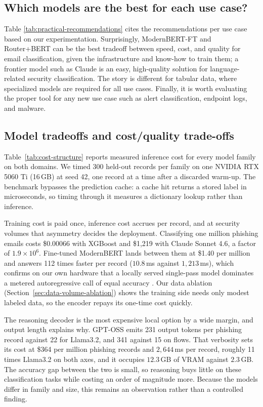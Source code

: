 \documentclass{jmlr}
\begin{document}
\subsection{Which models are the best for each use case?}
\label{sec:which-models-best}

Table \ref{tab:practical-recommendations} cites the recommendations per use case based on our experimentation. Surprisingly, ModernBERT-FT and Router+BERT can be the best tradeoff between speed, cost, and quality for email classification, given the infrastructure and know-how to train them; a frontier model such as Claude is an easy, high-quality solution for language-related security classification. The story is different for tabular data, where specialized models are required for all use cases. Finally, it is worth evaluating the proper tool for any new use case such as alert classification, endpoint logs, and malware.

\subsection{Model tradeoffs and cost/quality trade-offs}
\label{sec:model-tradeoffs}

Table~\ref{tab:cost-structure} reports measured inference cost for every model family on both domains. We timed 300 held-out records per family on one NVIDIA RTX 5060 Ti (16\,GB) at seed 42, one record at a time after a discarded warm-up. The benchmark bypasses the prediction cache: a cache hit returns a stored label in microseconds, so timing through it measures a dictionary lookup rather than inference.

Training cost is paid once, inference cost accrues per record, and at security volumes that asymmetry decides the deployment. Classifying one million phishing emails costs \$0.00066 with XGBoost and \$1{,}219 with Claude Sonnet 4.6, a factor of $1.9\times10^{6}$. Fine-tuned ModernBERT lands between them at \$1.40 per million and answers 112 times faster per record ($10.8$\,ms against $1{,}213$\,ms), which confirms on our own hardware that a locally served single-pass model dominates a metered autoregressive call of equal accuracy \citep{warner2024modernbert}. Our data ablation (Section~\ref{sec:data-volume-ablation}) shows the training side needs only modest labeled data, so the encoder repays its one-time cost quickly.

The reasoning decoder is the most expensive local option by a wide margin, and output length explains why. GPT-OSS emits 231 output tokens per phishing record against 22 for Llama3.2, and 341 against 15 on flows. That verbosity sets its cost at \$364 per million phishing records and $2{,}644$\,ms per record, roughly 11 times Llama3.2 on both axes, and it occupies $12.3$\,GB of VRAM against $2.3$\,GB. The accuracy gap between the two is small, so reasoning buys little on these classification tasks while costing an order of magnitude more. Because the models differ in family and size, this remains an observation rather than a controlled finding.
\end{document}
